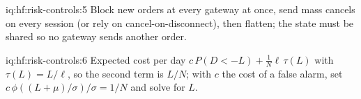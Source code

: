 \begin{solution}{iq:hf:risk-controls:5}
Block new orders at every gateway at once, send mass cancels on every session (or rely on cancel-on-disconnect), then flatten; the state must be
shared so no gateway sends another order.
\end{solution}

\begin{solution}{iq:hf:risk-controls:6}
Expected cost per day $c\,P(D<-L)+\frac1N\ell\,\tau(L)$ with $\tau(L)=L/\ell$, so the second term is $L/N$; with $c$ the cost of a false alarm,
set $c\,\phi((L+\mu)/\sigma)/\sigma=1/N$ and solve for $L$.
\end{solution}

